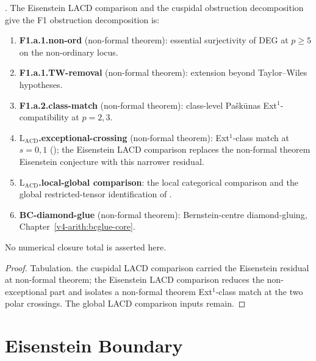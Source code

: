 \begin{proposition}
\label{v4-arith:w6-d:prop:F1-table-after-w6d}
\ClaimStatusProvedHere. The Eisenstein LACD comparison and the
cuspidal obstruction decomposition
 give the
F1 obstruction decomposition is:
\begin{enumerate}
\item \textbf{F1.a.1.non-ord} (non-formal theorem): essential surjectivity
of DEG at \(p\geq 5\) on the non-ordinary locus.
\item \textbf{F1.a.1.TW-removal} (non-formal theorem): extension beyond
Taylor--Wiles hypotheses.
\item \textbf{F1.a.2.class-match} (non-formal theorem): class-level
Pa{\v s}k{\=u}nas Ext\({}^{1}\)-compatibility at \(p=2,3\).
\item \textbf{\(\mathrm{L}_{\mathrm{ACD}}\).exceptional-crossing}
(non-formal theorem): Ext\({}^{1}\)-class match at \(s=0,1\)
(); the Eisenstein LACD comparison
replaces the non-formal theorem Eisenstein conjecture
 with this narrower
residual.
\item \textbf{\(\mathrm{L}_{\mathrm{ACD}}\).local-global comparison}:
the local categorical comparison and the global restricted-tensor
identification of .
\item \textbf{BC-diamond-glue} (non-formal theorem):
Bernstein-centre diamond-gluing, Chapter~\ref{v4-arith:bcglue-core}.
\end{enumerate}
No numerical closure total is asserted here.
\end{proposition}

\begin{proof}
Tabulation. the cuspidal LACD comparison carried the Eisenstein residual at non-formal theorem;
the Eisenstein LACD comparison reduces the non-exceptional part and isolates a non-formal theorem
Ext\({}^{1}\)-class match at the two polar crossings. The global LACD
comparison inputs remain.
\end{proof}

\section{Eisenstein Boundary}
\label{v4-arith:w6-d:summary}

